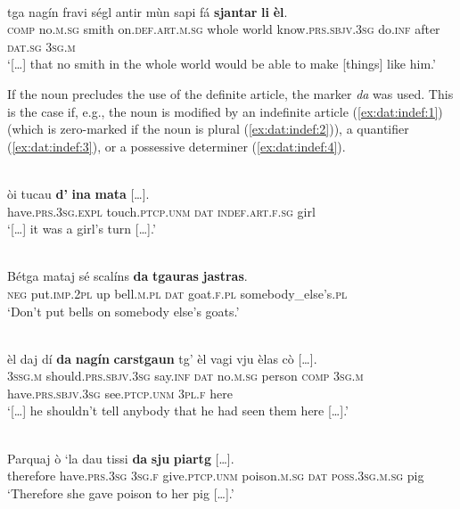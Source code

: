 \ea\label{}
\\
\gll   […] tga nagín fravi ségl antir mùn sapi fá \textbf{sjantar} \textbf{li} \textbf{èl}. \\
{}  \textsc{comp} no.\textsc{m.sg} smith on.\textsc{def.art.m.sg} whole world know.\textsc{prs.sbjv.3sg} do.\textsc{inf} after \textsc{dat.sg} \textsc{3sg.m}\\
\glt `[…] that no smith in the whole world would be able to make [things] like him.'
\z

If the noun precludes the use of the definite article, the marker \textit{da} was used. This is the case if, e.g., the noun is modified by an indefinite article (\ref{ex:dat:indef:1}) (which is zero-marked if the noun is plural (\ref{ex:dat:indef:2})), a quantifier (\ref{ex:dat:indef:3}), or a possessive determiner (\ref{ex:dat:indef:4}).

\ea\label{ex:dat:indef:1}
\\
\gll […] òi tucau \textbf{d'} \textbf{ina} \textbf{mata} […].\\
{} have.\textsc{prs.3sg.expl} touch.\textsc{ptcp.unm} \textsc{dat} \textsc{indef.art.f.sg} girl \\
\glt `[…] it was a girl's turn […].'
\z

\ea\label{ex:dat:indef:2}
\\
\gll Bétga mataj sé scalíns \textbf{da} \textbf{tgauras} \textbf{jastras}.\\
\textsc{neg} put.\textsc{imp.2pl} up bell.\textsc{m.pl} \textsc{dat} goat.\textsc{f.pl} somebody\_else’s.\textsc{pl}\\
\glt `Don’t put bells on somebody else’s goats.'
\z

\ea\label{ex:dat:indef:3}
\\
\gll […] èl daj dí \textbf{da} \textbf{nagín} \textbf{carstgaun} tg’ èl vagi vju èlas cò […].\\
{} \textsc{3ssg.m} should.\textsc{prs.sbjv.3sg} say.\textsc{inf} \textsc{dat} no.\textsc{m.sg} person \textsc{comp} \textsc{3sg.m} have.\textsc{prs.sbjv.3sg} see.\textsc{ptcp.unm} \textsc{3pl.f} here\\
\glt `[…] he shouldn’t tell anybody that he had seen them here […].'
\z

\ea\label{ex:dat:indef:4}
\\
\gll Parquaj ò ‘la dau tissi \textbf{da} \textbf{sju} \textbf{piartg} […].\\
therefore have.\textsc{prs.3sg} \textsc{3sg.f} give.\textsc{ptcp.unm} poison.\textsc{m.sg} \textsc{dat} \textsc{poss.3sg.m.sg} pig \\
\glt `Therefore she gave poison to her pig […].'
\z

